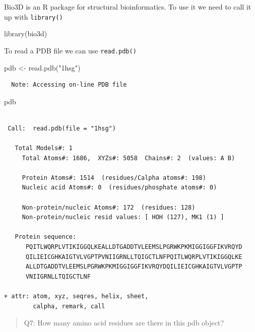 \documentclass[
  letterpaper,
  DIV=11,
  numbers=noendperiod]{scrartcl}
\newenvironment{Shaded}{\begin{snugshade}}{\end{snugshade}}
\newcommand{\FunctionTok}[1]{\textcolor[rgb]{0.28,0.35,0.67}{#1}}
\newcommand{\NormalTok}[1]{\textcolor[rgb]{0.00,0.23,0.31}{#1}}
\newcommand{\OtherTok}[1]{\textcolor[rgb]{0.00,0.23,0.31}{#1}}
\newcommand{\StringTok}[1]{\textcolor[rgb]{0.13,0.47,0.30}{#1}}
\begin{document}
Bio3D is an R package for structural bioinformatics. To use it we need
to call it up with \texttt{library()}

\begin{Shaded}
\begin{Highlighting}[]
\FunctionTok{library}\NormalTok{(bio3d)}
\end{Highlighting}
\end{Shaded}

To read a PDB file we can use \texttt{read.pdb()}

\begin{Shaded}
\begin{Highlighting}[]
\NormalTok{pdb }\OtherTok{\textless{}{-}} \FunctionTok{read.pdb}\NormalTok{(}\StringTok{"1hsg"}\NormalTok{)}
\end{Highlighting}
\end{Shaded}

\begin{verbatim}
  Note: Accessing on-line PDB file
\end{verbatim}

\begin{Shaded}
\begin{Highlighting}[]
\NormalTok{pdb}
\end{Highlighting}
\end{Shaded}

\begin{verbatim}

 Call:  read.pdb(file = "1hsg")

   Total Models#: 1
     Total Atoms#: 1686,  XYZs#: 5058  Chains#: 2  (values: A B)

     Protein Atoms#: 1514  (residues/Calpha atoms#: 198)
     Nucleic acid Atoms#: 0  (residues/phosphate atoms#: 0)

     Non-protein/nucleic Atoms#: 172  (residues: 128)
     Non-protein/nucleic resid values: [ HOH (127), MK1 (1) ]

   Protein sequence:
      PQITLWQRPLVTIKIGGQLKEALLDTGADDTVLEEMSLPGRWKPKMIGGIGGFIKVRQYD
      QILIEICGHKAIGTVLVGPTPVNIIGRNLLTQIGCTLNFPQITLWQRPLVTIKIGGQLKE
      ALLDTGADDTVLEEMSLPGRWKPKMIGGIGGFIKVRQYDQILIEICGHKAIGTVLVGPTP
      VNIIGRNLLTQIGCTLNF

+ attr: atom, xyz, seqres, helix, sheet,
        calpha, remark, call
\end{verbatim}

\begin{quote}
Q7: How many amino acid residues are there in this pdb object?
\end{quote}
\end{document}
